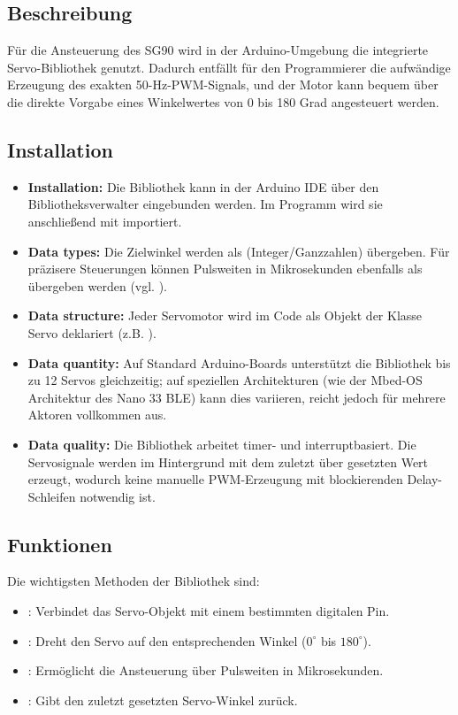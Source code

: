 \subsection{Beschreibung}
Für die Ansteuerung des SG90 wird in der Arduino-Umgebung die integrierte
Servo-Bibliothek genutzt\cite{ArduinoServo:2025}. Dadurch entfällt für den Programmierer die aufwändige Erzeugung des exakten 50-Hz-PWM-Signals, und der Motor kann bequem über die direkte Vorgabe eines Winkelwertes von 0 bis 180 Grad angesteuert werden.\cite{ArduinoServo:2025}

\subsection{Installation}
\begin{itemize}
	\item \textbf{Installation:} Die Bibliothek kann in der Arduino IDE über den Bibliotheksverwalter eingebunden werden. Im Programm wird sie anschlie\ss end mit  importiert.\cite{SparkFun:2026}

	\item \textbf{Data types:} Die Zielwinkel werden als  (Integer/Ganzzahlen) übergeben. Für präzisere Steuerungen können Pulsweiten in Mikrosekunden ebenfalls als  übergeben werden (vgl. \cite{ArduinoServo.h:2025}).
	\item \textbf{Data structure:} Jeder Servomotor wird im Code als Objekt der Klasse Servo deklariert (z.B. ).
	\item \textbf{Data quantity:} Auf Standard Arduino-Boards unterstützt die Bibliothek bis zu 12 Servos gleichzeitig; auf speziellen Architekturen (wie der Mbed-OS Architektur des Nano 33 BLE) kann dies variieren, reicht jedoch für mehrere Aktoren vollkommen aus.\cite{ArduinoServoRef:2026}
	\item \textbf{Data quality:} Die Bibliothek arbeitet timer- und interruptbasiert. Die Servosignale werden im Hintergrund mit dem zuletzt über  gesetzten Wert erzeugt, wodurch keine manuelle PWM-Erzeugung mit blockierenden Delay-Schleifen notwendig ist.\cite{ArduinoServo.h:2025}
\end{itemize}

\subsection{Funktionen}
Die wichtigsten Methoden der Bibliothek sind:
\begin{itemize}
	\item {}: Verbindet das Servo-Objekt mit einem bestimmten digitalen Pin.\cite{ArduinoAttach:2026}
	\item {}: Dreht den Servo auf den entsprechenden Winkel ($0^\circ$ bis $180^\circ$).
	\item {}: Ermöglicht die Ansteuerung über Pulsweiten in Mikrosekunden.\cite{ArduinoWriteMic:2026}
	\item {}: Gibt den zuletzt gesetzten Servo-Winkel zurück.\cite{ArduinoRead:2026}
\end{itemize}


